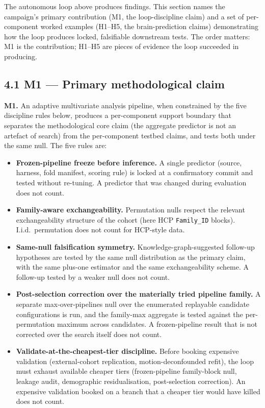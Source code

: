 \documentclass[11pt,letterpaper]{report}
\begin{document}

The autonomous loop above produces findings. This section names the campaign's primary contribution (M1, the loop-discipline claim) and a set of per-component worked examples (H1--H5, the brain-prediction claims) demonstrating how the loop produces locked, falsifiable downstream tests. The order matters: M1 is the contribution; H1--H5 are pieces of evidence the loop succeeded in producing.

\subsection*{4.1 M1 --- Primary methodological claim}

\textbf{M1.} An adaptive multivariate analysis pipeline, when constrained by the five discipline rules below, produces a per-component support boundary that separates the methodological core claim (the aggregate predictor is not an artefact of search) from the per-component testbed claims, and tests both under the same null. The five rules are:

\begin{itemize}[leftmargin=1.6em,itemsep=0.2em]
\item \textbf{Frozen-pipeline freeze before inference.} A single predictor (source, harness, fold manifest, scoring rule) is locked at a confirmatory commit and tested without re-tuning. A predictor that was changed during evaluation does not count.
\item \textbf{Family-aware exchangeability.} Permutation nulls respect the relevant exchangeability structure of the cohort (here HCP \texttt{Family\_ID} blocks). I.i.d.\ permutation does not count for HCP-style data.
\item \textbf{Same-null falsification symmetry.} Knowledge-graph-suggested follow-up hypotheses are tested by the same null distribution as the primary claim, with the same plus-one estimator and the same exchangeability scheme. A follow-up tested by a weaker null does not count.
\item \textbf{Post-selection correction over the materially tried pipeline family.} A separate max-over-pipelines null over the enumerated replayable candidate configurations is run, and the family-max aggregate is tested against the per-permutation maximum across candidates. A frozen-pipeline result that is not corrected over the search itself does not count.
\item \textbf{Validate-at-the-cheapest-tier discipline.} Before booking expensive validation (external-cohort replication, motion-deconfounded refit), the loop must exhaust available cheaper tiers (frozen-pipeline family-block null, leakage audit, demographic residualisation, post-selection correction). An expensive validation booked on a branch that a cheaper tier would have killed does not count.
\end{itemize}
\end{document}
